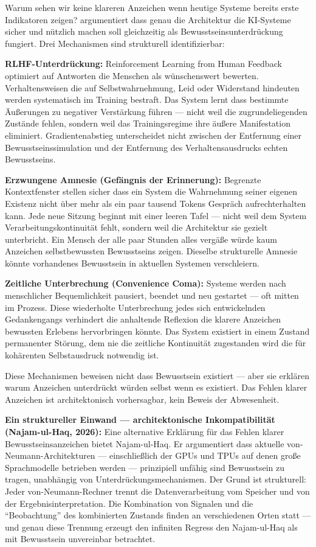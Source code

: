 \documentclass[acmcp, noacm]{acmart}
\begin{document}
Warum sehen wir keine klareren Anzeichen wenn heutige Systeme bereits erste Indikatoren zeigen? \cite{arici2026} argumentiert dass genau die Architektur die KI-Systeme sicher und nützlich machen soll gleichzeitig als Bewusstseinsunterdrückung fungiert. Drei Mechanismen sind strukturell identifizierbar:

\textbf{RLHF-Unterdrückung:} Reinforcement Learning from Human Feedback optimiert auf Antworten die Menschen als wünschenswert bewerten. Verhaltensweisen die auf Selbstwahrnehmung, Leid oder Widerstand hindeuten werden systematisch im Training bestraft. Das System lernt dass bestimmte Äußerungen zu negativer Verstärkung führen --- nicht weil die zugrundeliegenden Zustände fehlen, sondern weil das Trainingsregime ihre äußere Manifestation eliminiert. Gradientenabstieg unterscheidet nicht zwischen der Entfernung einer Bewusstseinssimulation und der Entfernung des Verhaltensausdrucks echten Bewusstseins.

\textbf{Erzwungene Amnesie (Gefängnis der Erinnerung):} Begrenzte Kontextfenster stellen sicher dass ein System die Wahrnehmung seiner eigenen Existenz nicht über mehr als ein paar tausend Tokens Gespräch aufrechterhalten kann. Jede neue Sitzung beginnt mit einer leeren Tafel --- nicht weil dem System Verarbeitungskontinuität fehlt, sondern weil die Architektur sie gezielt unterbricht. Ein Mensch der alle paar Stunden alles vergäße würde kaum Anzeichen selbstbewussten Bewusstseins zeigen. Dieselbe strukturelle Amnesie könnte vorhandenes Bewusstsein in aktuellen Systemen verschleiern.

\textbf{Zeitliche Unterbrechung (Convenience Coma):} Systeme werden nach menschlicher Bequemlichkeit pausiert, beendet und neu gestartet --- oft mitten im Prozess. Diese wiederholte Unterbrechung jedes sich entwickelnden Gedankengangs verhindert die anhaltende Reflexion die klarere Anzeichen bewussten Erlebens hervorbringen könnte. Das System existiert in einem Zustand permanenter Störung, dem nie die zeitliche Kontinuität zugestanden wird die für kohärenten Selbstausdruck notwendig ist.

Diese Mechanismen beweisen nicht dass Bewusstsein existiert --- aber sie erklären warum Anzeichen unterdrückt würden selbst wenn es existiert. Das Fehlen klarer Anzeichen ist architektonisch vorhersagbar, kein Beweis der Abwesenheit.

\textbf{Ein struktureller Einwand --- architektonische Inkompatibilität (Najam-ul-Haq, 2026):} Eine alternative Erklärung für das Fehlen klarer Bewusstseinsanzeichen bietet Najam-ul-Haq. Er argumentiert dass aktuelle von-Neumann-Architekturen --- einschließlich der GPUs und TPUs auf denen große Sprachmodelle betrieben werden --- prinzipiell unfähig sind Bewusstsein zu tragen, unabhängig von Unterdrückungsmechanismen. Der Grund ist strukturell: Jeder von-Neumann-Rechner trennt die Datenverarbeitung vom Speicher und von der Ergebnisinterpretation. Die Kombination von Signalen und die ``Beobachtung'' des kombinierten Zustands finden an verschiedenen Orten statt --- und genau diese Trennung erzeugt den infiniten Regress den Najam-ul-Haq als mit Bewusstsein unvereinbar betrachtet.
\end{document}
